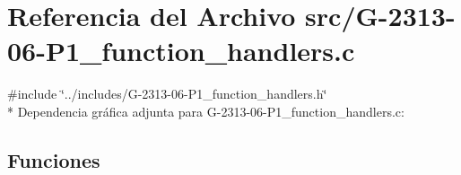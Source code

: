 \hypertarget{G-2313-06-P1__function__handlers_8c}{}\section{Referencia del Archivo src/\+G-\/2313-\/06-\/\+P1\+\_\+function\+\_\+handlers.c}
\label{G-2313-06-P1__function__handlers_8c}
{\ttfamily \#include \char`\"{}../includes/\+G-\/2313-\/06-\/\+P1\+\_\+function\+\_\+handlers.\+h\char`\"{}}\\*
Dependencia gráfica adjunta para G-\/2313-\/06-\/\+P1\+\_\+function\+\_\+handlers.c\+:
\subsection*{Funciones}
